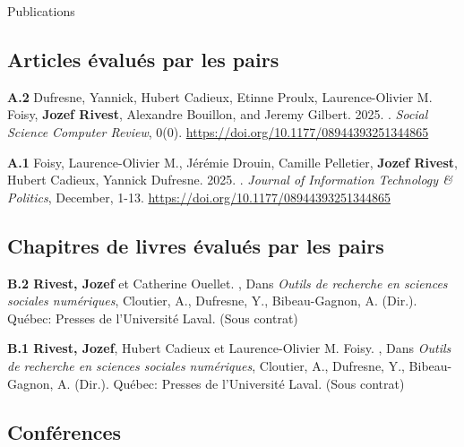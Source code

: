 \documentclass{resume} %
\begin{document}
\begin{rSection}{Publications}

\subsection*{Articles évalués par les pairs}

{\textbf{A.2} Dufresne, Yannick, Hubert Cadieux, Etinne Proulx, Laurence-Olivier M. Foisy, \textbf{Jozef Rivest}, Alexandre Bouillon, and Jeremy Gilbert. 2025. . \textit{Social Science Computer Review}, 0(0). \href{https://doi.org/10.1177/08944393251344865}{https://doi.org/10.1177/08944393251344865}}

{\textbf{A.1} Foisy, Laurence-Olivier M., Jérémie Drouin, Camille Pelletier, \textbf{Jozef Rivest}, Hubert Cadieux, Yannick Dufresne. 2025. . \textit{Journal of Information Technology \& Politics}, December, 1-13. \href{https://doi.org/10.1177/08944393251344865}{https://doi.org/10.1177/08944393251344865}}

\subsection*{Chapitres de livres évalués par les pairs}

{\textbf{B.2 Rivest, Jozef} et Catherine Ouellet. , Dans \textit{Outils de recherche en sciences sociales numériques}, Cloutier, A., Dufresne, Y., Bibeau-Gagnon, A. (Dir.). Québec: Presses de l'Université Laval. (Sous contrat)} \par

{\textbf{B.1 Rivest, Jozef}, Hubert Cadieux et Laurence-Olivier M. Foisy. , Dans \textit{Outils de recherche en sciences sociales numériques}, Cloutier, A., Dufresne, Y., Bibeau-Gagnon, A. (Dir.). Québec: Presses de l'Université Laval.} (Sous contrat) \par

\subsection*{Conférences}


\end{rSection}
\end{document}
